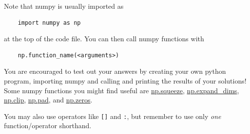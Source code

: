 Note that numpy is usually imported as
\begin{verbatim}
    import numpy as np
\end{verbatim}
at the top of the code file. You can then call numpy functions with \begin{verbatim}
    np.function_name(<arguments>)
\end{verbatim}
You are encouraged to test out your answers by creating your own python program, importing numpy and calling and printing the results of your solutions! Some numpy functions you might find useful are \href{https://numpy.org/doc/stable/reference/generated/numpy.squeeze.html}{np.squeeze}, \href{https://numpy.org/doc/stable/reference/generated/numpy.expand_dims.html}{np.expand\_dims}, \href{https://numpy.org/doc/stable/reference/generated/numpy.clip.html}{np.clip}, \href{https://numpy.org/doc/stable/reference/generated/numpy.pad.html}{np.pad}, and \href{https://numpy.org/doc/stable/reference/generated/numpy.zeros.html}{np.zeros}.

You may also use operators like \texttt{[]} and \texttt{:}, but remember to use only \textit{one} function/operator shorthand.

